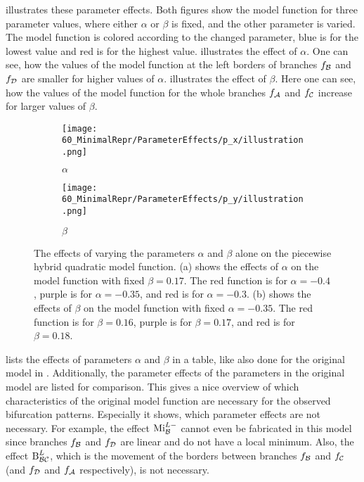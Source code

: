  illustrates these parameter effects.
Both figures show the model function for three parameter values, where either $\alpha$ or $\beta$ is fixed, and the other parameter is varied.
The model function is colored according to the changed parameter, blue is for the lowest value and red is for the highest value.
 illustrates the effect of $\alpha$.
One can see, how the values of the model function at the left borders of branches $f_{\mathcal{B}}$ and $f_{\mathcal{D}}$ are smaller for higher values of $\alpha$.
 illustrates the effect of $\beta$.
Here one can see, how the values of the model function for the whole branches $f_{\mathcal{A}}$ and $f_{\mathcal{C}}$ increase for larger values of $\beta$.

\begin{figure}
	\centering
	\begin{subfigure}{0.4\textwidth}
		\centering
		\texttt{[image: 60\_MinimalRepr/ParameterEffects/p\_x/illustration.png]}
		\caption{$\alpha$}
		\label{fig:setup.quad.hybrid.paramfx.alpha}
	\end{subfigure}
	\begin{subfigure}{0.4\textwidth}
		\centering
		\texttt{[image: 60\_MinimalRepr/ParameterEffects/p\_y/illustration.png]}
		\caption{$\beta$}
		\label{fig:setup.quad.hybrid.paramfx.beta}
	\end{subfigure}
	\caption[The effects of single parameters on the piecewise hybrid quadratic model function]{
		The effects of varying the parameters $\alpha$ and $\beta$ alone on the piecewise hybrid quadratic model function.
		(a) shows the effects of $\alpha$ on the model function with fixed $\beta = 0.17$.
		The red function is for $\alpha = -0.4$, purple is for $\alpha = -0.35$, and red is for $\alpha = -0.3$.
		(b) shows the effects of $\beta$ on the model function with fixed $\alpha = -0.35$.
		The red function is for $\beta = 0.16$, purple is for $\beta = 0.17$, and red is for $\beta = 0.18$.
	}
	\label{fig:setup.quad.hybrid.paramfx}
\end{figure}

 lists the effects of parameters $\alpha$ and $\beta$ in a table, like also done for the original model in .
Additionally, the parameter effects of the parameters in the original model are listed for comparison.
This gives a nice overview of which characteristics of the original model function are necessary for the observed bifurcation patterns.
Especially it shows, which parameter effects are not necessary.
For example, the effect $\operatorname{Mi}_{\mathcal{B}}^{L-}$ cannot even be fabricated in this model since branches $f_{\mathcal{B}}$ and $f_{\mathcal{D}}$ are linear and do not have a local minimum.
Also, the effect $\operatorname{B}_{\mathcal{B}\mathcal{C}}^L$, which is the movement of the borders between branches $f_{\mathcal{B}}$ and $f_{\mathcal{C}}$ (and $f_{\mathcal{D}}$ and $f_{\mathcal{A}}$ respectively), is not necessary.


